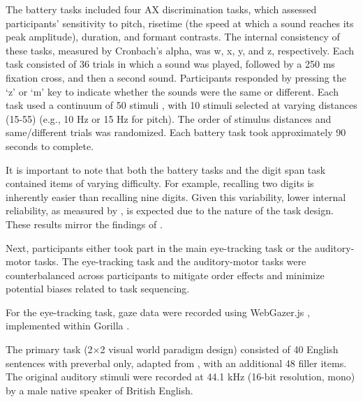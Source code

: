 The battery tasks included four AX discrimination tasks, which assessed participants’ sensitivity to pitch, risetime (the speed at which a sound reaches its peak amplitude), duration, and formant contrasts. The internal consistency of these tasks, measured by Cronbach’s alpha, was w, x, y, and z, respectively. Each task consisted of 36 trials in which a sound was played, followed by a 250 ms fixation cross, and then a second sound. Participants responded by pressing the ‘z’ or ‘m’ key to indicate whether the sounds were the same or different. Each task used a continuum of 50 stimuli \citep{Kachlicka_Saito_Tierney_2019}, with 10 stimuli selected at varying distances (15-55) (e.g., 10 Hz or 15 Hz for pitch). The order of stimulus distances and same/different trials was randomized. Each battery task took approximately 90 seconds to complete.

It is important to note that both the battery tasks and the digit span task contained items of varying difficulty. For example, recalling two digits is inherently easier than recalling nine digits. Given this variability, lower internal reliability, as measured by \cite{Cronbach1951}, is expected due to the nature of the task design. These results mirror the findings of \cite{ppcc}.

Next, participants either took part in the main eye-tracking task or the auditory-motor tasks. The eye-tracking task and the auditory-motor tasks were counterbalanced across participants to mitigate order effects and minimize potential biases related to task sequencing.

For the eye-tracking task, gaze data were recorded using WebGazer.js \citep{Papoutsaki}, implemented within Gorilla \citep{Anwyl-Irvine_2019}. 

The primary task (2×2 visual world paradigm design) consisted of 40 English sentences with preverbal only, adapted from \cite{Ge_etal_2021}, with an additional 48 filler items. The original auditory stimuli were recorded at 44.1 kHz (16-bit resolution, mono) by a male native speaker of British English.


